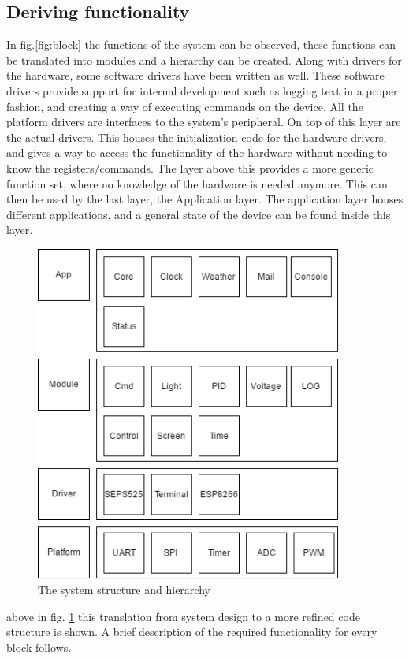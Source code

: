 \subsection{Deriving functionality}
In fig.\ref{fig:block} the functions of the system can be observed, these functions can be translated into modules and a hierarchy can be created. Along with drivers for the hardware, some software drivers have been written as well. These software drivers provide support for internal development such as logging text in a proper fashion, and creating a way of executing commands on the device. All the platform drivers are interfaces to the system's peripheral. On top of this layer are the actual drivers. This houses the initialization code for the hardware drivers, and gives a way to access the functionality of the hardware without needing to know the registers/commands. The layer above this provides a more generic function set, where no knowledge of the hardware is needed anymore. This can then be used by the last layer, the Application layer. The application layer houses different applications, and a general state of the device can be found inside this layer.
\begin{figure}[H]
	\centering
	\label{fig:block_code}
	\includegraphics[width=0.9\textwidth]{fig/block_code.png}
	\caption{The system structure and hierarchy}
\end{figure}
above in fig. \ref{fig:block_code} this translation from system design to a more refined code structure is shown. A brief description of the required functionality for every block follows. 


